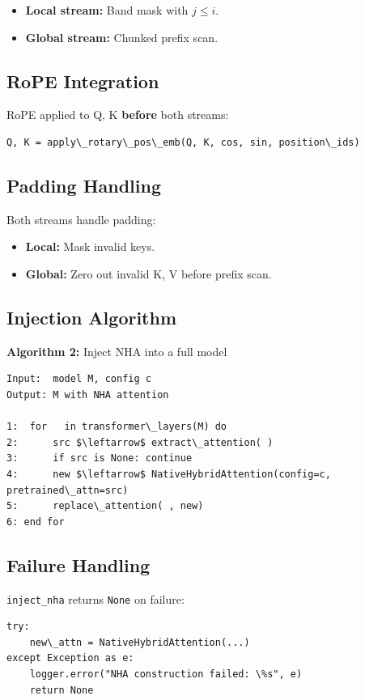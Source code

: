 \begin{itemize}
\item \textbf{Local stream:} Band mask with $j \le i$.
\item \textbf{Global stream:} Chunked prefix scan.

\end{itemize}
\subsection{RoPE Integration}

RoPE applied to Q, K \textbf{before} both streams:

\begin{lstlisting}
Q, K = apply\_rotary\_pos\_emb(Q, K, cos, sin, position\_ids)
\end{lstlisting}

\subsection{Padding Handling}

Both streams handle padding:
\begin{itemize}
\item \textbf{Local:} Mask invalid keys.
\item \textbf{Global:} Zero out invalid K, V before prefix scan.

\end{itemize}
\subsection{Injection Algorithm}

\textbf{Algorithm 2:} Inject NHA into a full model
\begin{lstlisting}
Input:  model M, config c
Output: M with NHA attention

1:  for   in transformer\_layers(M) do
2:      src $\leftarrow$ extract\_attention( )
3:      if src is None: continue
4:      new $\leftarrow$ NativeHybridAttention(config=c, pretrained\_attn=src)
5:      replace\_attention( , new)
6: end for
\end{lstlisting}

\subsection{Failure Handling}

\texttt{inject\_nha} returns \texttt{None} on failure:

\begin{lstlisting}
try:
    new\_attn = NativeHybridAttention(...)
except Exception as e:
    logger.error("NHA construction failed: \%s", e)
    return None
\end{lstlisting}

